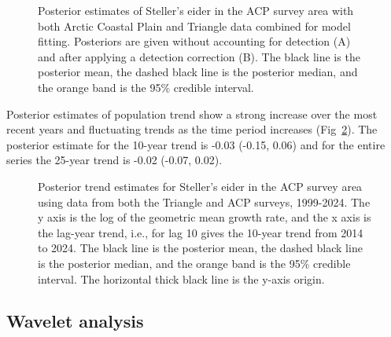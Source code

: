 \documentclass[
  10pt,
  letterpaper,
]{article}
\begin{document}
\begin{figure}

\begin{minipage}{\linewidth}

\subcaption{\label{fig-combA}}

\end{minipage}%
\newline
\begin{minipage}{\linewidth}

\subcaption{\label{fig-combB}}

\end{minipage}%

\caption{\label{fig-yearComb}Posterior estimates of Steller's eider in
the ACP survey area with both Arctic Coastal Plain and Triangle data
combined for model fitting. Posteriors are given without accounting for
detection (A) and after applying a detection correction (B). The black
line is the posterior mean, the dashed black line is the posterior
median, and the orange band is the 95\% credible interval.}

\end{figure}%

Posterior estimates of population trend show a strong increase over the
most recent years and fluctuating trends as the time period increases
(Fig~\ref{fig-trendComb}). The posterior estimate for the 10-year trend
is -0.03 (-0.15, 0.06) and for the entire series the 25-year trend is
-0.02 (-0.07, 0.02).

\begin{figure}

\caption{\label{fig-trendComb}Posterior trend estimates for Steller's
eider in the ACP survey area using data from both the Triangle and ACP
surveys, 1999-2024. The y axis is the log of the geometric mean growth
rate, and the x axis is the lag-year trend, i.e., for lag 10 gives the
10-year trend from 2014 to 2024. The black line is the posterior mean,
the dashed black line is the posterior median, and the orange band is
the 95\% credible interval. The horizontal thick black line is the
y-axis origin.}

\end{figure}%

\subsection{Wavelet analysis}\label{wavelet-analysis-1}
\end{document}
